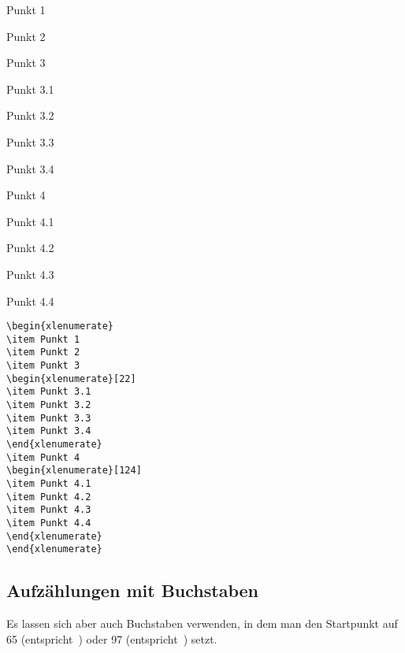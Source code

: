 \documentclass{fontdokuold}
\begin{document}
\begin{xlenumerate}
\item Punkt 1
\item Punkt 2
\item Punkt 3
\begin{xlenumerate}[22]
\item Punkt 3.1
\item Punkt 3.2
\item Punkt 3.3
\item Punkt 3.4
\end{xlenumerate}
\item Punkt 4
\begin{xlenumerate}[124]
\item Punkt 4.1
\item Punkt 4.2
\item Punkt 4.3
\item Punkt 4.4
\end{xlenumerate}
\end{xlenumerate}

\begin{lstlisting}
\begin{xlenumerate}
\item Punkt 1
\item Punkt 2
\item Punkt 3
\begin{xlenumerate}[22]
\item Punkt 3.1
\item Punkt 3.2
\item Punkt 3.3
\item Punkt 3.4
\end{xlenumerate}
\item Punkt 4
\begin{xlenumerate}[124]
\item Punkt 4.1
\item Punkt 4.2
\item Punkt 4.3
\item Punkt 4.4
\end{xlenumerate}
\end{xlenumerate}
\end{lstlisting}

\subsection{Aufzählungen mit Buchstaben}

Es lassen sich aber auch Buchstaben verwenden, in dem man den Startpunkt
auf 65 (entspricht~) oder 97 (entspricht~) setzt.
\end{document}
